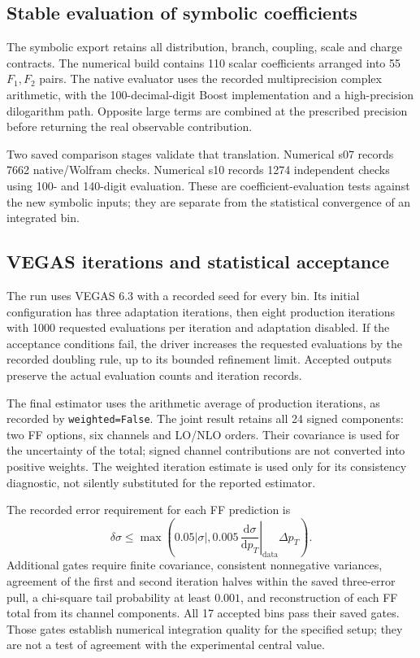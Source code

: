\documentclass[11pt,a4paper]{article}
\newcommand{\dd}{\mathrm{d}}
\begin{document}
\subsection{Stable evaluation of symbolic coefficients}

The symbolic export retains all distribution, branch, coupling, scale
and charge contracts. The numerical build contains 110 scalar
coefficients arranged into 55 $F_1,F_2$ pairs. The native evaluator
uses the recorded multiprecision complex arithmetic, with the
100-decimal-digit Boost implementation and a high-precision
dilogarithm path. Opposite large terms are combined at the prescribed
precision before returning the real observable contribution.

Two saved comparison stages validate that translation. Numerical s07
records 7662 native/Wolfram checks. Numerical s10 records 1274
independent checks using 100- and 140-digit evaluation. These are
coefficient-evaluation tests against the new symbolic inputs; they are
separate from the statistical convergence of an integrated bin.

\subsection{VEGAS iterations and statistical acceptance}

The run uses VEGAS 6.3 with a recorded seed for every bin. Its initial
configuration has three adaptation iterations, then eight production
iterations with 1000 requested evaluations per iteration and adaptation
disabled. If the acceptance conditions fail, the driver increases the
requested evaluations by the recorded doubling rule, up to its bounded
refinement limit. Accepted outputs preserve the actual evaluation
counts and iteration records.

The final estimator uses the arithmetic average of production
iterations, as recorded by \texttt{weighted=False}. The joint result
retains all 24 signed components: two FF options, six channels and LO/NLO
orders. Their covariance is used for the uncertainty of the total;
signed channel contributions are not converted into positive weights.
The weighted iteration estimate is used only for its consistency
diagnostic, not silently substituted for the reported estimator.

The recorded error requirement for each FF prediction is
\begin{equation}
 \delta\sigma\leq
 \max\!\left(0.05|\sigma|,
 0.005\,\left.\frac{\dd\sigma}{\dd p_T}\right|_{\mathrm{data}}
 \Delta p_T\right).
 \label{eq:mcgate}
\end{equation}
Additional gates require finite covariance, consistent nonnegative
variances, agreement of the first and second iteration halves within
the saved three-error pull, a chi-square tail probability at least
$0.001$, and reconstruction of each FF total from its channel
components. All 17 accepted bins pass their saved gates. Those gates
establish numerical integration quality for the specified setup; they
are not a test of agreement with the experimental central value.
\end{document}
